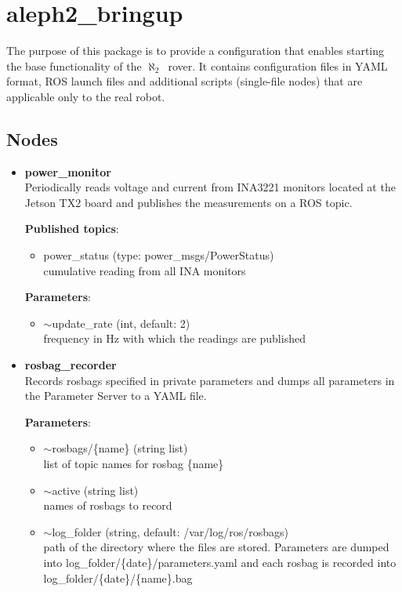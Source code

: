 \documentclass[english,inz,shortabstract]{iithesis}
\newcommand{\val}[1]{\textbf{\textsf{#1}}}
\newcommand{\rovername}{$\aleph_2$\ }
\begin{document}
\section{aleph2\_bringup}
The purpose of this package is to provide a configuration that enables starting the base functionality of the \rovername rover. It contains configuration files in YAML format, ROS launch files and additional scripts (single-file nodes) that are applicable only to the real robot.

	\subsection{Nodes}
		\begin{itemize}
			\item \val{power\_monitor}\\
			Periodically reads voltage and current from INA3221 monitors located at the Jetson TX2 board and publishes the measurements on a ROS topic.

			\textbf{Published topics}:
			\begin{itemize}[itemsep=0pt, parsep=2pt, topsep=0pt]
				\item \textsf{power\_status} (type: \textsf{power\_msgs/PowerStatus})\\
				cumulative reading from all INA monitors
			\end{itemize}

			\textbf{Parameters}:
			\begin{itemize}[itemsep=0pt, parsep=2pt, topsep=0pt]
				\item \textsf{$\sim$update\_rate} (\textsf{int}, default: \textsf{2})\\
				frequency in Hz with which the readings are published
			\end{itemize}

			\item \val{rosbag\_recorder}\\
			Records rosbags specified in private parameters and dumps all parameters in the Parameter Server to a YAML file.

			\textbf{Parameters}:
			\begin{itemize}[itemsep=0pt, parsep=2pt, topsep=0pt]
				\item \textsf{$\sim$rosbags/\{name\}} (\textsf{string list})\\
				list of topic names for rosbag \{name\}
				\item \textsf{$\sim$active} (\textsf{string list})\\
				names of rosbags to record
				\item \textsf{$\sim$log\_folder} (\textsf{string}, default: \textsf{/var/log/ros/rosbags})\\
				path of the directory where the files are stored. Parameters are dumped into \textsf{log\_folder/\{date\}/parameters.yaml} and each rosbag is recorded into \textsf{log\_folder/\{date\}/\{name\}.bag}
			\end{itemize}
		\end{itemize}
\end{document}
